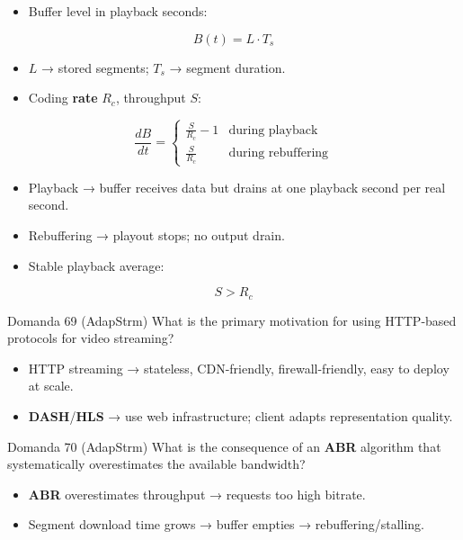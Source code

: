 \begin{itemize}
  \item Buffer level in playback seconds:
\end{itemize}


$$
B(t)=L\cdot T_s
$$


\begin{itemize}
  \item $L$ → stored segments; $T_s$ → segment duration.
  \item Coding \textbf{rate} $R_c$, throughput $S$:
\end{itemize}


$$
\frac{dB}{dt}=
\begin{cases}
\frac{S}{R_c}-1 & \text{during playback}\\
\frac{S}{R_c} & \text{during rebuffering}
\end{cases}
$$


\begin{itemize}
  \item Playback → buffer receives data but drains at one playback second per real second.
  \item Rebuffering → playout stops; no output drain.
  \item Stable playback average:
\end{itemize}


$$
S>R_c
$$




\begin{questionbox}{Domanda 69}
(AdapStrm) What is the primary motivation for using HTTP-based protocols for video streaming?
\end{questionbox}


\begin{itemize}
  \item HTTP streaming → stateless, CDN-friendly, firewall-friendly, easy to deploy at scale.
  \item \textbf{DASH}/\textbf{HLS} → use web infrastructure; client adapts representation quality.
\end{itemize}



\begin{questionbox}{Domanda 70}
(AdapStrm) What is the consequence of an \textbf{ABR} algorithm that systematically overestimates the available bandwidth?
\end{questionbox}


\begin{itemize}
  \item \textbf{ABR} overestimates throughput → requests too high bitrate.
  \item Segment download time grows → buffer empties → rebuffering/stalling.
\end{itemize}



